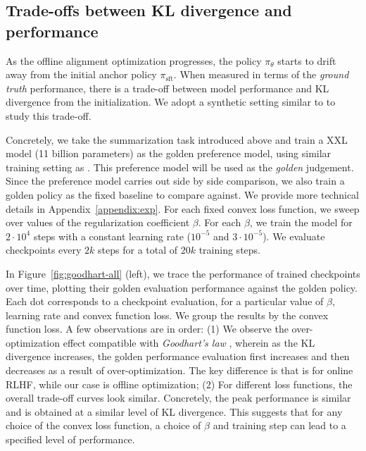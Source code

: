 \subsection{Trade-offs between KL divergence and performance}

As the offline alignment optimization progresses, the policy $\pi_\theta$ starts to drift away from the initial anchor policy $\pi_\text{sft}$. When measured in terms of the \emph{ground truth} performance, there is a trade-off between model performance and KL divergence from the initialization. We adopt a synthetic setting similar to \citep{gao2023scaling} to study this trade-off. 

Concretely, we take the summarization task introduced above and train a XXL model (11 billion parameters) as the golden preference model, using similar training setting as \citet{munos2023nash}. This preference model will be used as the \emph{golden} judgement. Since the preference model carries out side by side comparison, we also train a golden policy as the fixed baseline to compare against. We provide more technical details in Appendix~\ref{appendix:exp}. For each fixed convex loss function, we sweep over values of the regularization coefficient $\beta$. For each $\beta$, we train the model for $2\cdot 10^4$ steps with a constant learning rate ($10^{-5}$ and $3\cdot 10^{-5}$). We evaluate checkpoints every $2k$ steps for a total of $20k$ training steps.

In Figure~\ref{fig:goodhart-all} (left), we trace the performance of trained checkpoints over time, plotting their golden evaluation performance against the golden policy. Each dot corresponds to a checkpoint evaluation, for a particular value of $\beta$, learning rate and convex function loss. We group the results by the convex function loss. A few observations are in order: (1) We observe the over-optimization effect compatible with \emph{Goodhart's law} \citet{gao2023scaling}, wherein as the KL divergence increases, the golden performance evaluation first increases and then decreases as a result of over-optimization. The key difference is that \citep{gao2023scaling} is for online RLHF, while our case is offline optimization; (2) For different loss functions, the overall trade-off curves look similar. Concretely, the peak performance is similar and is obtained at a similar level of KL divergence. This suggests that for any choice of the convex loss function, a choice of $\beta$ and training step can lead to a specified level of performance. 

